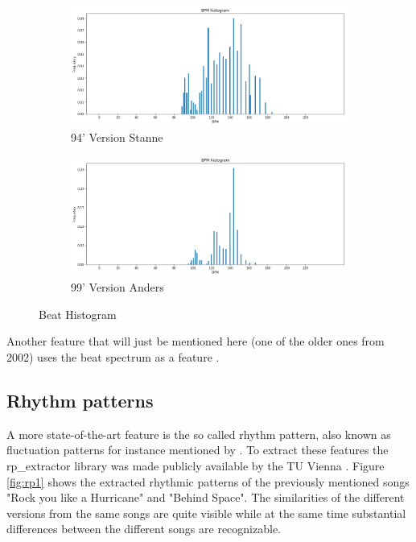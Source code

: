 \begin{figure}[htbp]
{{			\begin{subfigure}{.495\textwidth}
				\centering
				\includegraphics[scale=0.25]{Images/Beat/s_s_bh.png}
				\caption{94' Version Stanne}
				\label{ssbh}
			\end{subfigure}%
			\begin{subfigure}{.495\textwidth}
				\centering
				\includegraphics[scale=0.25]{Images/Beat/s_a_bh.png}
				\caption{99' Version Anders}
				\label{sabh}
			\end{subfigure}%
	}}
	\caption{Beat Histogram}
	\label{fig:bh1}
\end{figure}

\FloatBarrier
 
Another feature that will just be mentioned here (one of the older ones from 2002) uses the beat spectrum as a feature \cite{rhythm1}.

\subsection{Rhythm patterns}

A more state-of-the-art feature is the so called rhythm pattern, also known as fluctuation patterns for instance mentioned by \cite{rp1}. 
To extract these features the rp\_extractor library \cite{rp_extract} was made publicly available by the TU Vienna \cite{rp_extract2}. Figure \ref{fig:rp1} shows the extracted rhythmic patterns of the previously mentioned songs "Rock you like a Hurricane" and "Behind Space". The similarities of the different versions from the same songs are quite visible while at the same time substantial differences between the different songs are recognizable.

